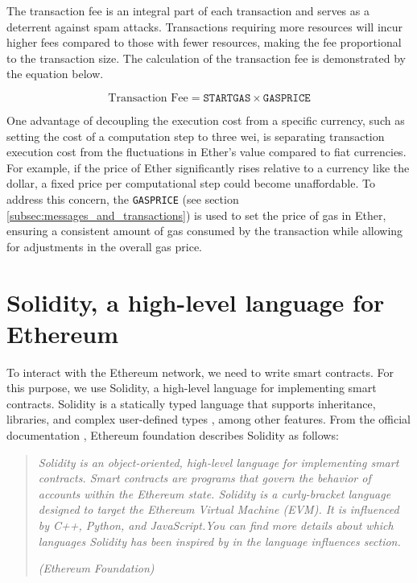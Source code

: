 The transaction fee is an integral part of each transaction and serves as a deterrent against spam attacks. Transactions requiring more resources will incur higher fees compared 
to those with fewer resources, making the fee proportional to the transaction size. The calculation of the transaction fee is demonstrated by the equation below.


\begin{equation}
   \label{eq:transaction_fee}
   \text{Transaction Fee} = \texttt{STARTGAS} \times \texttt{GASPRICE}
\end{equation}


One advantage of decoupling the execution cost from a specific currency, such as setting the cost of a computation step to three wei, is separating transaction 
execution cost from the fluctuations in Ether's value compared to fiat currencies. For example, if the price of Ether significantly rises relative to a currency like the 
dollar, a fixed price per computational step could become unaffordable. To address this concern, the \texttt{GASPRICE} (see section \ref{subsec:messages_and_transactions}) 
is used to set the price of gas in Ether, ensuring a consistent amount of gas consumed by the transaction while allowing for adjustments in the overall gas price.



\section{Solidity, a high-level language for Ethereum}
\label{sec:ch2_solidity}


To interact with the Ethereum network, we need to write smart contracts. For this purpose, we use Solidity, a high-level language for
implementing smart contracts. Solidity is a statically typed language that supports inheritance, libraries, and complex user-defined types
, among other features.
From the official documentation \cite{ethereum_solidity_doc}, Ethereum foundation describes Solidity as follows:


\begin{quote}
   \textit{Solidity is an object-oriented, high-level language for implementing smart contracts. Smart contracts are programs that govern the behavior of accounts within the Ethereum state.
       Solidity is a curly-bracket language designed to target the Ethereum Virtual Machine (EVM). It is influenced by C++, Python, and JavaScript.You can find more details about which languages Solidity has been inspired by in the language influences section.}


   \textit{(Ethereum Foundation)}
\end{quote}



